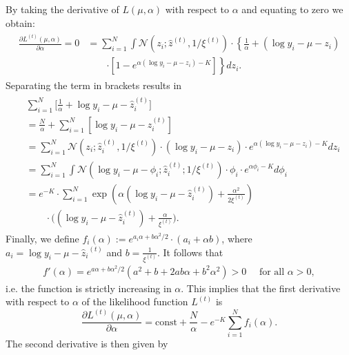 By taking the derivative of $L(\mu, \alpha)$ with respect to $\alpha$ and equating to zero we obtain:
\begin{align}
    \begin{split}
    \frac{\partial L^{(t)}(\mu, \alpha)}{\partial \alpha} = 0 & = \sum_{i=1}^N \int \mathcal{N}(z_i; \hat{z}^{(t)}, 1 / \xi^{(t)}) \cdot \left\{\frac{1}{\alpha} + \left(\log y_i - \mu - z_i\right) \right. \\
    & \qquad \left. \cdot \left[1 - e^{\alpha\left(\log y_i - \mu - z_i\right) - K}\right]\right\} dz_i.
    \end{split} 
\end{align}
Separating the term in brackets results in
\begin{align}
    \begin{split}
     & \sum_{i=1}^N \bigg [\frac{1}{\alpha} + \log y_i - \mu - \hat{z}_i^{(t)} \bigg ] \\
     &=
     \frac{N}{\alpha} + \sum_{i=1}^N [\log y_i - \mu - \hat{z}_i^{(t)}]  \\ 
     &= \sum_{i=1}^N \mathcal{N}(z_i; \hat{z}_i^{(t)}, 1 / \xi^{(t)}) \cdot (\log y_i - \mu - z_i) \cdot e^{\alpha(\log y_i - \mu - z_i) - K} dz_i \\
    &= \sum_{i=1}^N \int \mathcal{N}(\log y_i - \mu - \phi_i; \hat{z}_i^{(t)}; 1/\xi^{(t)}) \cdot \phi_i \cdot e^{\alpha \phi_i - K} d \phi_i \\
    &= e^{-K} \cdot \sum_{i=1}^N \exp(\alpha (\log y_i - \mu - \hat{z}_i^{(t)}) + \frac{\alpha^2}{2 \xi^{(t)}}) \\
    & \qquad \cdot \bigg ( (\log y_i - \mu - \hat{z}_i^{(t)}) + \frac{\alpha}{\xi^{(t)}} \bigg ).
    \end{split}
\end{align}
Finally, we define $f_{i}(\alpha) := e^{a_i \alpha + b \alpha^2 / 2} \cdot (a_i + \alpha b)$, where $a_i = \log y_i - \mu - {\hat{z}_i}^{(t)}$ and $b = \frac{1}{\xi^{(t)}}$. It follows that
\begin{align}
    f'(\alpha) = e^{a \alpha + b \alpha^2 / 2} ( a^2 + b + 2 ab \alpha + b^2 \alpha^2) > 0 \quad \text{ for all } \alpha > 0,
\end{align}
i.e. the function is strictly increasing in $\alpha$. This implies that the first derivative with respect to $\alpha$ of the likelihood function $L^{(t)}$ is
\begin{equation}
\frac{\partial L^{(t)}(\mu, \alpha)}{\partial \alpha} = \text{const} + \frac{N}{\alpha} - e^{-K} \sum_{i=1}^{N}f_i(\alpha).
\end{equation}
The second derivative is then given by

